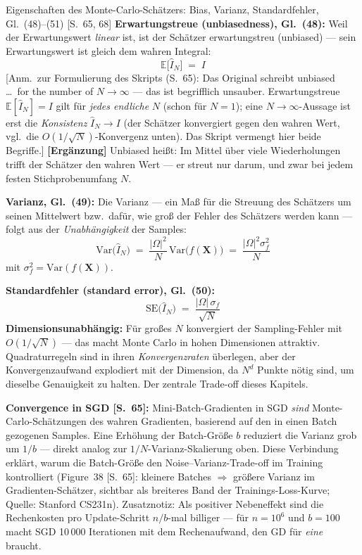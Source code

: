 \begin{satzbox}{Eigenschaften des Monte-Carlo-Schätzers: Bias, Varianz, Standardfehler, Gl.~(48)--(51) [S.~65, 68]}
\textbf{Erwartungstreue (unbiasedness), Gl.~(48):} Weil der Erwartungswert
\emph{linear} ist, ist der Schätzer erwartungstreu (unbiased) --- sein Erwartungswert
ist gleich dem wahren Integral:
\[
  \mathbb{E}\bigl[\hat{I}_N\bigr] \;=\; I \tag{48}
\]
[Anm.\ zur Formulierung des Skripts (S.~65): Das Original schreibt \glqq unbiased
\ldots\ for the number of $N \to \infty$\grqq{} --- das ist begrifflich unsauber.
Erwartungstreue $\mathbb{E}[\hat{I}_N] = I$ gilt für \emph{jedes endliche} $N$ (schon
für $N = 1$); eine $N \to \infty$-Aussage ist erst die \emph{Konsistenz}
$\hat{I}_N \to I$ (der Schätzer konvergiert gegen den wahren Wert, vgl.\ die
$O(1/\sqrt{N})$-Konvergenz unten). Das Skript vermengt hier beide Begriffe.]
\textbf{[Ergänzung]} \glqq Unbiased\grqq{} hei{\ss}t: Im Mittel über viele
Wiederholungen trifft der Schätzer den wahren Wert --- er streut nur darum, und zwar
bei jedem festen Stichprobenumfang $N$.

\medskip
\textbf{Varianz, Gl.~(49):} Die Varianz --- ein Ma{\ss} für die Streuung des Schätzers
um seinen Mittelwert bzw.\ dafür, wie gro{\ss} der Fehler des Schätzers werden kann
--- folgt aus der \emph{Unabhängigkeit} der Samples:
\[
  \mathrm{Var}\bigl(\hat{I}_N\bigr) \;=\; \frac{|\Omega|^2}{N}\,\mathrm{Var}\bigl(f(\mathbf{X})\bigr)
  \;=\; \frac{|\Omega|^2 \sigma_f^2}{N} \tag{49}
\]
mit $\sigma_f^2 = \mathrm{Var}(f(\mathbf{X}))$.

\medskip
\textbf{Standardfehler (standard error), Gl.~(50):}
\[
  \mathrm{SE}\bigl(\hat{I}_N\bigr) \;=\; \frac{|\Omega|\,\sigma_f}{\sqrt{N}} \tag{50}
\]
\textbf{Dimensionsunabhängig:} Für gro{\ss}es $N$ konvergiert der Sampling-Fehler mit
$O(1/\sqrt{N})$ --- das macht Monte Carlo in hohen Dimensionen attraktiv.
Quadraturregeln sind in ihren \emph{Konvergenzraten} überlegen, aber der
Konvergenzaufwand explodiert mit der Dimension, da $N^d$ Punkte nötig sind, um
dieselbe Genauigkeit zu halten. Der zentrale Trade-off dieses Kapitels.

\medskip
\textbf{Convergence in SGD [S.~65]:} Mini-Batch-Gradienten in SGD \emph{sind}
Monte-Carlo-Schätzungen des wahren Gradienten, basierend auf den in einen Batch
gezogenen Samples. Eine Erhöhung der Batch-Grö{\ss}e $b$ reduziert die Varianz grob um
$1/b$ --- direkt analog zur $1/N$-Varianz-Skalierung oben. Diese Verbindung erklärt,
warum die Batch-Grö{\ss}e den Noise--Varianz-Trade-off im Training kontrolliert
(Figure~38 [S.~65]: kleinere Batches $\Rightarrow$ grö{\ss}ere Varianz im
Gradienten-Schätzer, sichtbar als breiteres Band der Trainings-Loss-Kurve; Quelle:
Stanford CS231n). Zusatznotiz: Als positiver Nebeneffekt sind die Rechenkosten pro
Update-Schritt $n/b$-mal billiger --- für $n = 10^6$ und $b = 100$ macht SGD
10\,000 Iterationen mit dem Rechenaufwand, den GD für \emph{eine} braucht.


\end{satzbox}
